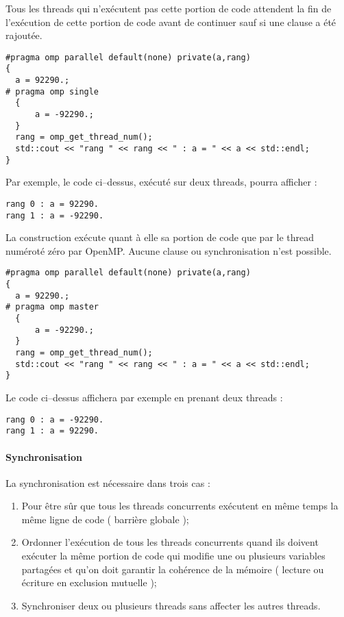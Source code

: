 \documentclass[fleqn,11pt]{article}
\begin{document}
Tous les threads qui n'exécutent pas cette portion de code attendent la fin
de l'exécution de cette portion de code avant de continuer sauf si une clause
\verb@nowait@ a été rajoutée.

\begin{lstlisting}
#pragma omp parallel default(none) private(a,rang)
{
  a = 92290.;
# pragma omp single
  {
      a = -92290.;
  }
  rang = omp_get_thread_num();
  std::cout << "rang " << rang << " : a = " << a << std::endl;
}
\end{lstlisting}

Par exemple, le code ci--dessus, exécuté sur deux threads, pourra afficher  :
\begin{verbatim}
rang 0 : a = 92290.
rang 1 : a = -92290.
\end{verbatim}

La construction \verb@master@ exécute quant à elle sa portion de code
que par le thread numéroté zéro par OpenMP. Aucune clause ou synchronisation
n'est possible.
\begin{lstlisting}
#pragma omp parallel default(none) private(a,rang)
{
  a = 92290.;
# pragma omp master
  {
      a = -92290.;
  }
  rang = omp_get_thread_num();
  std::cout << "rang " << rang << " : a = " << a << std::endl;
}
\end{lstlisting}

Le code ci--dessus affichera par exemple en prenant
deux threads :
\begin{verbatim}
rang 0 : a = -92290.
rang 1 : a = 92290.
\end{verbatim}

\paragraph{Synchronisation}

La synchronisation est nécessaire dans trois cas :
\begin{enumerate}
 \item Pour être sûr que tous les threads concurrents exécutent en même temps
 la même ligne de code ( barrière globale );
 \item Ordonner l'exécution de tous les threads concurrents quand ils doivent
 exécuter la même portion de code qui modifie une ou plusieurs variables partagées
 et qu'on doit garantir la cohérence de la mémoire ( lecture ou écriture en
 exclusion mutuelle );
 \item Synchroniser deux ou plusieurs threads sans affecter les autres threads.
\end{enumerate}
\end{document}
